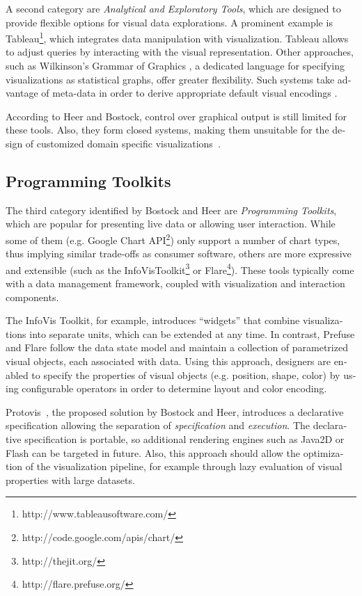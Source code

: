 \begin{english}
A second category are \emph{Analytical and Exploratory Tools}, which are designed to provide flexible options for visual data explorations. A prominent example is Tableau\footnote{http://www.tableausoftware.com/}, which integrates data manipulation with visualization. Tableau allows to adjust queries by interacting with the visual representation. Other approaches, such as Wilkinson's Grammar of Graphics \cite{wilkinson2005grammar}, a dedicated language for specifying visualizations as statistical graphs, offer greater flexibility. Such systems take advantage of meta-data in order to derive appropriate default visual encodings \cite{Bertin83,Mackinlay86automatingthe}.

According to Heer and Bostock, control over graphical output is still limited for these tools. Also, they form closed systems, making them unsuitable for the design of customized domain specific visualizations~\cite{Protovis09}.


\subsection{Programming Toolkits}

The third category identified by Bostock and Heer are \emph{Programming Toolkits}, which are popular for presenting live data or allowing user interaction. While some of them (e.g. Google Chart API\footnote{http://code.google.com/apis/chart/}) only support a number of chart types, thus implying similar trade-offs as consumer software, others are more expressive and extensible (such as the InfoVisToolkit\footnote{http://thejit.org/} or Flare\footnote{http://flare.prefuse.org/}). These tools typically come with a data management framework, coupled with visualization and interaction components.

The InfoVis Toolkit, for example, introduces ``widgets'' that combine visualizations into separate units, which can be extended at any time. In contrast, Prefuse and Flare follow the data state model \cite{Chi98anoperator} and maintain a collection of parametrized visual objects, each associated with data. Using this approach, designers are enabled to specify the properties of visual objects (e.g. position, shape, color) by using configurable operators in order to determine layout and color encoding. 

Protovis~\cite{Protovis09}, the proposed solution by Bostock and Heer, introduces a declarative specification allowing the separation of \emph{specification} and \emph{execution}. The declarative specification is portable, so additional rendering engines such as Java2D or Flash can be targeted in future. Also, this approach should allow the optimization of the visualization pipeline, for example through lazy evaluation of visual properties with large datasets.



\end{english}
